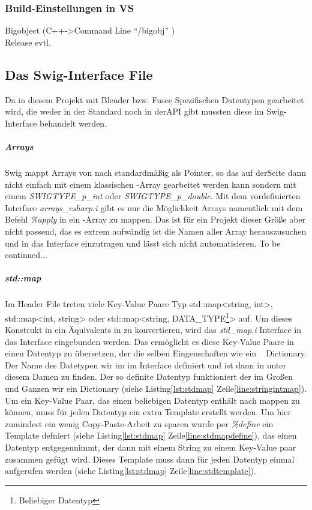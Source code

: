   

\subsubsection{Build-Einstellungen in VS}\label{subsubsec:Build}
	Bigobject (C++->Command Line "`/bigobj"' )\\
	Release evtl.


\subsection{Das Swig-Interface File}\label{subsubsec:swiginterface}
Da in diesem Projekt mit Blender bzw. Fusee Spezifischen Datentypen gearbeitet wird, die weder in der Standard \CC noch in der\CS API gibt mussten diese im Swig-Interface behandelt werden. 

\subparagraph{Arrays}
Swig mappt Arrays von \CC nach \CS standardmäßig als Pointer, so das auf der\CS Seite dann nicht einfach mit einem klassischen \CS-Array gearbeitet werden kann sondern mit einem \emph{SWIGTYPE\_p\_int} oder \emph{SWIGTYPE\_p\_double}. Mit dem vordefinierten Interface \emph{arrays\_csharp.i} gibt es nur die Möglichkeit Arrays namentlich mit dem Befehl \emph{\%apply} in ein \CS-Array zu mappen. Das ist für ein Projekt dieser Größe aber nicht passend, das es extrem aufwändig ist die Namen aller Array herauszusuchen und in das Interface einzutragen und lässt sich nicht automatisieren.
To be continued...

\subparagraph{std::map}

Im Header File treten viele Key-Value Paare Typ std::map<string, int>, std::map<int, string> oder std::map<string, DATA\_TYPE\footnote{Beliebiger Datentyp}> auf. Um dieses Konstrukt in ein Äquivalents in \CS zu konvertieren, wird das \emph{std\_map.i} Interface in das Interface eingebunden werden. Das ermöglicht es diese Key-Value Paare in einen Datentyp zu übersetzen, der die selben Eingenschaften wie ein \CS~ Dictionary. Der Name des Datetypen wir im im Interface definiert und ist dann in \CS unter diesem Damen zu finden. Der so definite Datentyp funktioniert der im Großen und Ganzen wir ein Dictionary (siehe Listing\ref{lst:stdmap} Zeile\ref{line:stringintmap}). Um ein Key-Value Paar, das einen beliebigen Datentyp enthält nach \CS mappen zu können, muss für jeden Datentyp ein extra Template erstellt werden. Um hier zumindest ein wenig Copy-Paste-Arbeit zu sparen wurde per \emph{\%define} ein Template defniert (siehe Listing\ref{lst:stdmap} Zeile\ref{line:stdmapdefine}), das einen Datentyp entgegennimmt, der dann mit einem String zu einem Key-Value paar zusammen gefügt wird. Dieses Template muss dann für jeden Datentyp einmal aufgerufen werden (siehe Listing\ref{lst:stdmap} Zeile\ref{line:stdtemplate}). 

